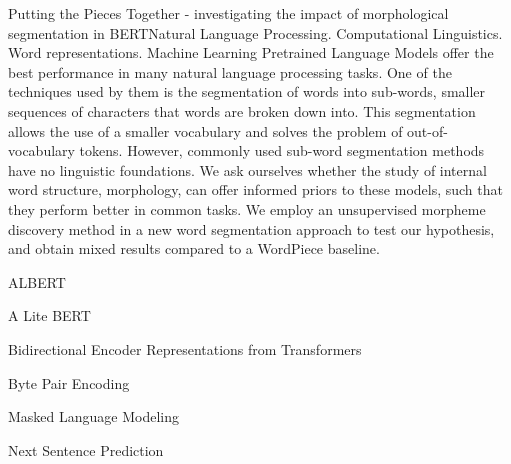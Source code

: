 \documentclass[cic,tc]{iiufrgs}
\begin{document}
\begin{englishabstract}{Putting the Pieces Together - investigating the impact of morphological segmentation in BERT}{Natural Language Processing. Computational Linguistics. Word representations. Machine Learning}
    Pretrained Language Models offer the best performance in many natural language processing tasks. One of the techniques used by them is the segmentation of words into sub-words, smaller sequences of characters that words are broken down into. This segmentation allows the use of a smaller vocabulary and solves the problem of out-of-vocabulary tokens. However, commonly used sub-word segmentation methods have no linguistic foundations. We ask ourselves whether the study of internal word structure, morphology, can offer informed priors to these models, such that they perform better in common tasks. We employ an unsupervised morpheme discovery method in a new word segmentation approach to test our hypothesis, and obtain mixed results compared to a WordPiece baseline.
\end{englishabstract}

\listoffigures

\listoftables

\begin{listofabbrv}{ALBERT}
    \item[ALBERT] A Lite BERT
    \item[BERT] Bidirectional Encoder Representations from Transformers
    \item[BPE] Byte Pair Encoding
    \item[MLM] Masked Language Modeling
    \item[NSP] Next Sentence Prediction
\end{listofabbrv}


\tableofcontents

\end{document}
